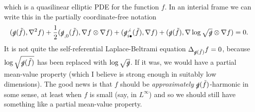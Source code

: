 \documentclass[reqno,12pt,letterpaper]{amsart}
\theoremstyle{definition}
\numberwithin{equation}{section}
\begin{document}
which is a quasilinear elliptic PDE for the function $f$.
In an interial frame we can write this in the partially coordinate-free notation
$$(\slashed g(\tilde f), \nabla^2 f) + \frac{1}{2} (\slashed g_{,0}(\tilde f), \nabla f \otimes \nabla f) + (\slashed g^{,i}_{i\bullet}(\tilde f), \nabla f) + (\slashed g(\tilde f), \nabla \log \sqrt{\slashed g} \otimes \nabla f) = 0.$$
It is not quite the self-referential Laplace-Beltrami equation $\Delta_{\slashed g(\tilde f)} f = 0$, because $\log \sqrt{\slashed g(\tilde f)}$ has been replaced with $\log \sqrt{\slashed g}$.
If it was, we would have a partial mean-value property (which I believe is strong enough in suitably low dimensions).
The good news is that $f$ should be \emph{approximately} $\slashed g(\tilde f)$-harmonic in some sense, at least when $f$ is small (say, in $L^\infty$) and so we should still have something like a partial mean-value property.

\printbibliography
\end{document}
